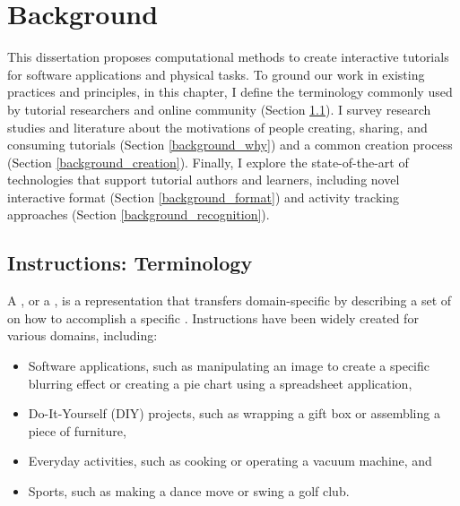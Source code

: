 
\chapter{Background}

This dissertation proposes computational methods to create interactive tutorials for software applications and physical tasks. To ground our work in existing practices and principles, in this chapter, I define the terminology commonly used by tutorial researchers and online community (Section \ref{background_terms}).
%
I survey research studies and literature about the motivations of people creating, sharing, and consuming tutorials (Section \ref{background_why}) and a common creation process (Section \ref{background_creation}).
%
Finally, I explore the state-of-the-art of technologies that support tutorial authors and learners, including novel interactive format (Section \ref{background_format}) and activity tracking approaches (Section \ref{background_recognition}).


\section{Instructions: Terminology}
\label{background_terms}

A , or a , is a representation that transfers domain-specific  by describing a set of  on how to accomplish a specific . Instructions have been widely created for various domains, including:

\begin{itemize}
  \itemsep -2pt
  \item Software applications, such as manipulating an image to create a specific blurring effect or creating a pie chart using a spreadsheet application,
  \item Do-It-Yourself (DIY) projects, such as wrapping a gift box or assembling a piece of furniture,
  \item Everyday activities, such as cooking or operating a vacuum machine, and
  \item Sports, such as making a dance move or swing a golf club.
\end{itemize}

